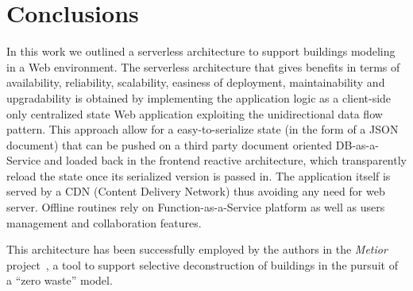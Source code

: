 \section{Conclusions}\label{sec:conclusions}

In this work we outlined a serverless architecture to support buildings modeling in a Web environment. The serverless  architecture that gives benefits in terms of availability, reliability, scalability, easiness of deployment, maintainability and upgradability is obtained by implementing the application logic as a client-side only centralized state Web application exploiting the unidirectional data flow pattern. This approach allow for a easy-to-serialize state (in the form of a JSON document) that can be pushed on a third party document oriented DB-as-a-Service and loaded back in the frontend reactive architecture, which transparently reload the state once its serialized version is passed in. The application itself is served by a CDN (Content Delivery Network) thus avoiding any need for web server. Offline routines rely on Function-as-a-Service platform as well as users management and collaboration features.

This architecture has been successfully employed by the authors in the \emph{Metior} project~\cite{CITARE METIOR}, a tool to support selective deconstruction of buildings in the pursuit of a ``zero waste'' model.
